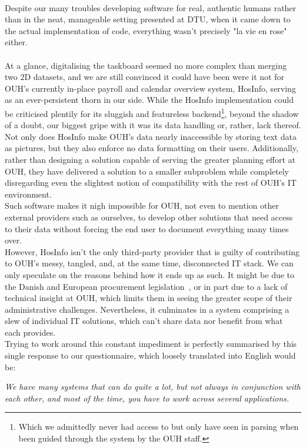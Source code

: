 \\
Despite our many troubles developing software for real, authentic humans rather than in the neat, manageable setting presented at DTU, when it came down to the actual implementation of code, everything wasn't precisely "la vie en rose" either.
\\
\\
At a glance, digitalising the taskboard seemed no more complex than merging two 2D datasets, and we are still convinced it could have been were it not for OUH's currently in-place payroll and calendar overview system, HosInfo, serving as an ever-persistent thorn in our side. While the HosInfo implementation could be criticised plentily for its sluggish and featureless backend\footnote{Which we admittedly never had access to but only have seen in parsing when been guided through the system by the OUH staff.}, beyond the shadow of a doubt, our biggest gripe with it was its data handling or, rather, lack thereof. Not only does HosInfo make OUH's data nearly inaccessible by storing text data as pictures, but they also enforce no data formatting on their users. Additionally, rather than designing a solution capable of serving the greater planning effort at OUH, they have delivered a solution to a smaller subproblem while completely disregarding even the slightest notion of compatibility with the rest of OUH's IT environment.
\\
Such software makes it nigh impossible for OUH, not even to mention other external providers such as ourselves, to develop other solutions that need access to their data without forcing the end user to document everything many times over.
\\ 
However, HosInfo isn't the only third-party provider that is guilty of contributing to OUH's messy, tangled, and, at the same time, disconnected IT stack. We can only speculate on the reasons behind how it ends up as such. It might be due to the Danish and European procurement legislation~\cite{Udbudsloven, EU-Procurement-Legislation}, or in part due to a lack of technical insight at OUH, which limits them in seeing the greater scope of their administrative challenges. Nevertheless, it culminates in a system comprising a slew of individual IT solutions, which can't share data nor benefit from what each provides.
\\
Trying to work around this constant impediment is perfectly summarised by this single response to our questionnaire, which loosely translated into English would be:
\begin{center}
 \textit{We have many systems that can do quite a lot, but not always in conjunction with each other, and most of the time, you have to work across several applications.}
\end{center}
